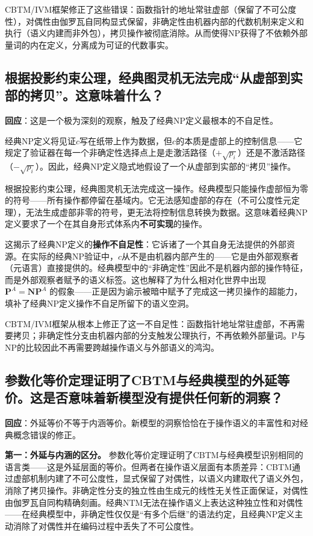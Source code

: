 \documentclass{ctexart}
\begin{document}
	CBTM/IVM框架修正了这些错误：函数指针的地址常驻虚部（保留了不可公度性），对偶性由伽罗瓦自同构显式保留，非确定性由机器内部的代数机制来定义和执行（语义内建而非外包），拷贝操作被彻底消除。从而使得NP获得了不依赖外部量词的内在定义，分离成为可证的代数事实。
	
	
	\subsection{根据投影约束公理，经典图灵机无法完成``从虚部到实部的拷贝''。这意味着什么？}
	
	\textbf{回应}：这是一个极为深刻的观察，触及了经典NP定义最根本的不自足性。
	
	经典NP定义将见证$c$写在纸带上作为数据，但$c$的本质是虚部上的控制信息——它规定了验证器在每一个非确定性选择点上是走激活路径（$+\sqrt{p_i}$）还是不激活路径（$-\sqrt{p_i}$）。因此，经典NP定义隐式地假设了一个从虚部到实部的``拷贝''操作。
	
	根据投影约束公理，经典图灵机无法完成这一操作。经典模型只能操作虚部恒为零的符号——所有操作都停留在基域内。它无法感知虚部的存在（不可公度性元定理），无法生成虚部非零的符号，更无法将控制信息转换为数据。这意味着经典NP定义要求了一个在其自身形式体系内\textbf{不可实现}的操作。
	
	这揭示了经典NP定义的\textbf{操作不自足性}：它诉诸了一个其自身无法提供的外部资源。在实际的经典NP验证中，$c$从不是由机器内部产生的——它是由外部观察者（元语言）直接提供的。经典模型中的``非确定性''因此不是机器内部的操作特征，而是外部观察者赋予的语义标签。这也解释了为什么相对化世界中出现 $\mathbf{P}^A = \mathbf{NP}^A$ 的假象——正是因为谕示被暗中赋予了完成这一拷贝操作的超能力，填补了经典NP定义操作不自足所留下的语义空洞。
	
	CBTM/IVM框架从根本上修正了这一不自足性：函数指针地址常驻虚部，不再需要拷贝；非确定性分支由机器内部的分支触发公理执行，不再依赖外部量词。P与NP的比较因此不再需要跨越操作语义与外部语义的鸿沟。
	
	
	\subsection{参数化等价定理证明了CBTM与经典模型的外延等价。这是否意味着新模型没有提供任何新的洞察？}
	
	\textbf{回应}：外延等价不等于内涵等价。新模型的洞察恰恰在于操作语义的丰富性和对经典概念错误的修正。
	
	\textbf{第一：外延与内涵的区分。} 参数化等价定理证明了CBTM与经典模型识别相同的语言类——这是外延层面的等价。但两者在操作语义层面有本质差异：CBTM通过虚部机制内建了不可公度性，显式保留了对偶性，以语义内建取代了语义外包，消除了拷贝操作。非确定性分支的独立性由生成元的线性无关性正面保证，对偶性由伽罗瓦自同构精确刻画。经典NTM无法在操作语义上表达这种独立性和对偶性——在经典模型中，非确定性仅仅是``有多个后继''的语法约定，且经典NP定义主动消除了对偶性并在编码过程中丢失了不可公度性。
	
\end{document}
